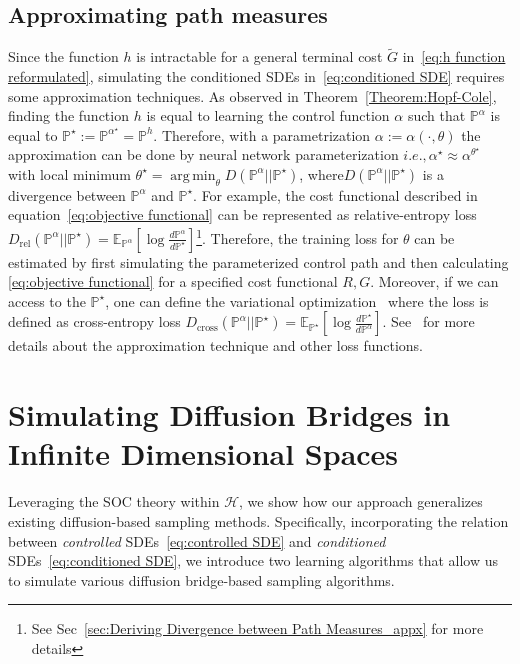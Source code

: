 \documentclass[nohyperref]{article}
\theoremstyle{plain}
\theoremstyle{remark}
\newcommand{\mc}{\mathcal}
\DeclareMathOperator*{\argmin}{arg\,min}
\newcommand{\ie}{\textit{i}.\textit{e}., }
\begin{document}
\subsection{Approximating path measures}\label{sec:Approximating path measures}
Since the function $h$ is intractable for a general terminal cost $\tilde{G}$ in~\eqref{eq:h function reformulated}, simulating the conditioned SDEs in~\eqref{eq:conditioned SDE} requires some approximation techniques. As observed in Theorem~\ref{Theorem:Hopf-Cole}, finding the function $h$ is equal to learning the control function $\alpha$ such that $\mathbb{P}^{\alpha}$ is equal to $\mathbb{P}^{\star} := \mathbb{P}^{\alpha^{\star}} = \mathbb{P}^{h}$. Therefore, with a parametrization $\alpha := \alpha(\cdot, \theta)$ the approximation can be done by neural network parameterization 
$\ie \alpha^{\star} \approx \alpha^{\theta^{\star}}$ with local minimum $\theta^{\star} = \argmin_{\theta} D(\mathbb{P}^{\alpha}||\mathbb{P}^{\star})$, where$D(\mathbb{P}^{\alpha}||\mathbb{P}^{\star})$ is a divergence between $\mathbb{P}^{\alpha}$ and $\mathbb{P}^{\star}$. For example, the cost functional described in equation~\eqref{eq:objective functional} can be represented as relative-entropy loss $D_{\text{rel}}(\mathbb{P}^{\alpha}||\mathbb{P}^{\star}) = \mathbb{E}_{\mathbb{P}^{\alpha}}\left[\log \frac{d\mathbb{P}^{\alpha}}{d\mathbb{P}^{\star}}\right]$\footnote{See Sec~\ref{sec:Deriving Divergence between Path Measures_appx} for more details}. Therefore, the training loss for $\theta$ can be estimated by first simulating the parameterized control path and then calculating \eqref{eq:objective functional} for a specified cost functional $R, G$. Moreover, if we can access to the $\mathbb{P}^{\star}$, one can define the variational optimization~\citep{8618948} where the loss is defined as cross-entropy loss $D_{\text{cross}}(\mathbb{P}^{\alpha}||\mathbb{P}^{\star}) = \mathbb{E}_{\mathbb{P}^{\star}}\left[\log \frac{d\mathbb{P}^{\star}}{d\mathbb{P}^{\alpha}}\right]$. 
See~\citep{nusken2021solving, domingo2023stochastic} for more details about the approximation technique and other loss functions.

\section{Simulating Diffusion Bridges in Infinite Dimensional Spaces}
Leveraging the SOC theory within $\mc{H}$, we show how our approach generalizes existing diffusion-based sampling methods. Specifically, incorporating the relation between \textit{controlled} SDEs~\eqref{eq:controlled SDE} and \textit{conditioned} SDEs~\eqref{eq:conditioned SDE}, we introduce two learning algorithms that allow us to simulate various diffusion bridge-based sampling algorithms.
\end{document}
